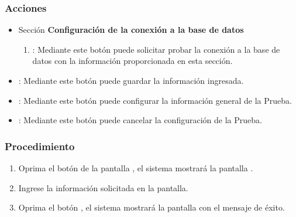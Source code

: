 \subsubsection{Acciones}
\begin{itemize}
 \item Sección \textbf{Configuración de la conexión a la base de datos}
  \begin{enumerate}
	\item {}: Mediante este botón puede solicitar probar la conexión a la base de datos con la información proporcionada en esta sección.
  \end{enumerate}
 \item {}: Mediante este botón puede guardar la información ingresada.
 \item {}: Mediante este botón puede configurar la información general de la Prueba.
 \item {}: Mediante este botón puede cancelar la configuración de la Prueba.
\end{itemize}
	
	
\subsubsection{Procedimiento}
\begin{enumerate}
	\item Oprima el botón \btnConfigurarPrueba de la pantalla , el sistema mostrará la pantalla . 

	
	\item Ingrese la información solicitada en la pantalla.
	
	\item Oprima el botón , el sistema mostrará la pantalla  con el mensaje de éxito.
\end{enumerate}


